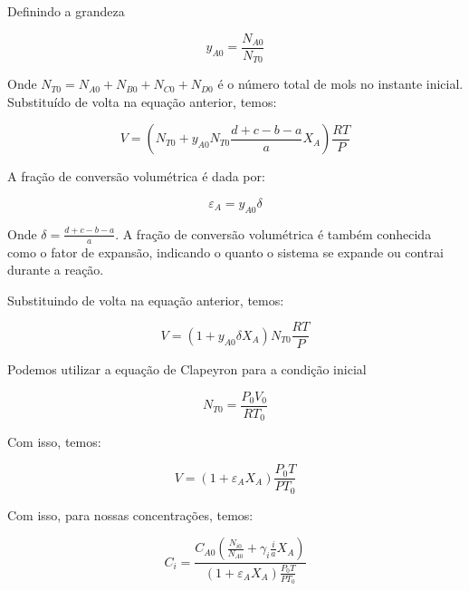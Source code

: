 Definindo a grandeza 

\begin{equation}
    y_{A0} = \frac{N_{A0} }{N_{T0}}
\end{equation}

Onde \(N_{T0} = N_{A0} + N_{B0} + N_{C0} + N_{D0} \) é o número total de mols no instante inicial.
Substituído de volta na equação anterior, temos:

\begin{equation}
    V = \left( N_{T0} + y_{A0} N_{T0} \frac{d+c-b-a}{a}X_A \right) \frac{RT}{P}
\end{equation}

A fração de conversão volumétrica é dada por:

\begin{equation}
    \varepsilon _A = y_{A0} \delta  
\end{equation}

Onde \(\delta = \frac{d+c-b-a}{a}\). A fração de conversão volumétrica é também conhecida como o
fator  de expansão, indicando o quanto o sistema se expande ou contrai durante a reação. \par

Substituindo de volta na equação anterior, temos:

\begin{equation}
    V = \left( 1 + y_{A0} \delta X_A \right) N_{T0} \frac{RT}{P}    
\end{equation}

Podemos utilizar a equação de Clapeyron para a condição inicial

\begin{equation}
    N_{T0} = \frac{P_0 V_0}{RT_0}
\end{equation}

Com isso, temos:

\begin{equation}
    V = \left( 1 + \varepsilon_A X_A \right) \frac{P_{0} T }{P T_0}
\end{equation}

Com isso, para nossas concentrações, temos:

\begin{equation}\label{eq:cap3_concentracao_volume_variavel}
    C_i = \frac{C_{A0}\left( \frac{N_{i0}}{N_{A0} } +\gamma_i \frac{i}{a}X_A\right)}{\left( 1 + \varepsilon_A X_A \right) \frac{P_0T}{PT_0} }
\end{equation}
